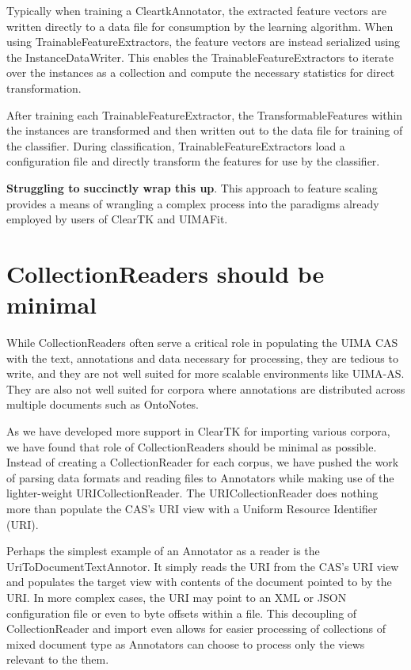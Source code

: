 \documentclass[10pt, a4paper]{article}
\begin{document}
Typically when training a CleartkAnnotator, the extracted feature vectors are written directly to a data file for consumption by the learning algorithm.  When using TrainableFeatureExtractors, the feature vectors are instead serialized using the InstanceDataWriter.  This enables the TrainableFeatureExtractors to iterate over the instances as a collection and compute the necessary statistics for direct transformation.

After training each TrainableFeatureExtractor, the TransformableFeatures within the instances are transformed and then written out to the data file for training of the classifier.
During classification, TrainableFeatureExtractors load a configuration file and directly transform the features for use by the classifier.

\textbf{Struggling to succinctly wrap this up}.  This approach to feature scaling provides a means of wrangling a complex process into the paradigms already employed by users of ClearTK and UIMAFit.


\section{CollectionReaders should be minimal}

While CollectionReaders often serve a critical role in populating the UIMA CAS with the text, annotations and data necessary for processing, they are tedious to write, and they are not well suited for more scalable environments like UIMA-AS.  They are also not well suited for corpora where annotations are distributed across multiple documents such as OntoNotes.

As we have developed more support in ClearTK for importing various corpora, we have found that role of CollectionReaders should be minimal as possible.  Instead of creating a CollectionReader for each corpus, we have pushed the work of parsing data formats and reading files to Annotators while making use of the lighter-weight URICollectionReader.  The URICollectionReader does nothing more than populate the CAS's URI view with a Uniform Resource Identifier (URI).  

Perhaps the simplest example of an Annotator as a reader is the UriToDocumentTextAnnotor. It simply reads the URI from the CAS's URI view and populates the target view with contents of the document pointed to by the URI.  In more complex cases, the URI may point to an XML or JSON configuration file or even to byte offsets within a file.  This decoupling of CollectionReader and import even allows for easier processing of collections of mixed document type as Annotators can choose to process only the views relevant to the them.
\end{document}
